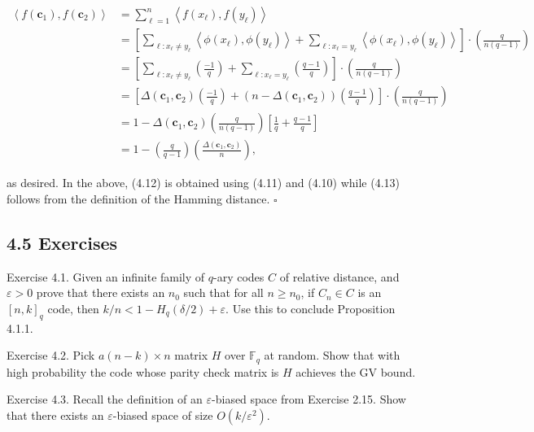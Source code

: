 \documentclass[10pt]{article}
\begin{document}
\begin{align*}
\left\langle f\left(\mathbf{c}_{1}\right), f\left(\mathbf{c}_{2}\right)\right\rangle & =\sum_{\ell=1}^{n}\left\langle f\left(x_{\ell}\right), f\left(y_{\ell}\right)\right\rangle \\
& =\left[\sum_{\ell: x_{\ell} \neq y_{\ell}}\left\langle\phi\left(x_{\ell}\right), \phi\left(y_{\ell}\right)\right\rangle+\sum_{\ell: x_{\ell}=y_{\ell}}\left\langle\phi\left(x_{\ell}\right), \phi\left(y_{\ell}\right)\right\rangle\right] \cdot\left(\frac{q}{n(q-1)}\right) \\
& =\left[\sum_{\ell: x_{\ell} \neq y_{\ell}}\left(\frac{-1}{q}\right)+\sum_{\ell: x_{\ell}=y_{\ell}}\left(\frac{q-1}{q}\right)\right] \cdot\left(\frac{q}{n(q-1)}\right)  \tag{4.12}\\
& =\left[\Delta\left(\mathbf{c}_{1}, \mathbf{c}_{2}\right)\left(\frac{-1}{q}\right)+\left(n-\Delta\left(\mathbf{c}_{1}, \mathbf{c}_{2}\right)\right)\left(\frac{q-1}{q}\right)\right] \cdot\left(\frac{q}{n(q-1)}\right)  \tag{4.13}\\
& =1-\Delta\left(\mathbf{c}_{1}, \mathbf{c}_{2}\right)\left(\frac{q}{n(q-1)}\right)\left[\frac{1}{q}+\frac{q-1}{q}\right] \\
& =1-\left(\frac{q}{q-1}\right)\left(\frac{\Delta\left(\mathbf{c}_{1}, \mathbf{c}_{2}\right)}{n}\right),
\end{align*}


as desired. In the above, (4.12) is obtained using (4.11) and (4.10) while (4.13) follows from the definition of the Hamming distance. \(\square\)

\subsection*{4.5 Exercises}
Exercise 4.1. Given an infinite family of $q$-ary codes $C$ of relative distance, and $\varepsilon>0$ prove that there exists an $n_{0}$ such that for all $n \geq n_{0}$, if $C_{n} \in C$ is an $[n, k]_{q}$ code, then $k / n<1-H_{q}(\delta / 2)+\varepsilon$. Use this to conclude Proposition 4.1.1.

Exercise 4.2. Pick $a(n-k) \times n$ matrix $H$ over $\mathbb{F}_{q}$ at random. Show that with high probability the code whose parity check matrix is $H$ achieves the GV bound.

Exercise 4.3. Recall the definition of an $\varepsilon$-biased space from Exercise 2.15. Show that there exists an $\varepsilon$-biased space of size $O\left(k / \varepsilon^{2}\right)$.
\end{document}

